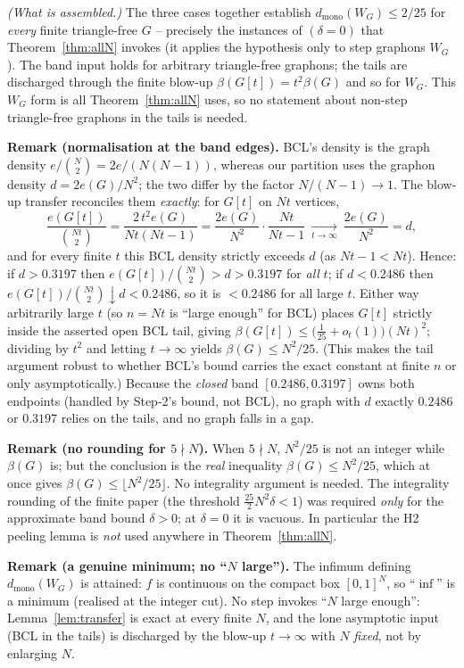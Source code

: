 \noindent\emph{(What is assembled.)} The three cases together establish
$d_{\mathrm{mono}}(W_G)\le 2/25$ for \emph{every} finite triangle-free $G$ -- precisely
the instances of $(\delta{=}0)$ that Theorem~\ref{thm:allN} invokes (it applies the
hypothesis only to step graphons $W_G$). The band input holds for arbitrary triangle-free
graphons; the tails are discharged through the finite blow-up $\beta(G[t])=t^2\beta(G)$ and
so for $W_G$. This $W_G$ form is all Theorem~\ref{thm:allN} uses, so no statement about
non-step triangle-free graphons in the tails is needed.

\noindent\textbf{Remark (normalisation at the band edges).} BCL's density is the
graph density $e/\binom{N}{2}=2e/(N(N-1))$, whereas our partition uses the graphon
density $d=2e(G)/N^2$; the two differ by the factor $N/(N-1)\to1$. The blow-up transfer
reconciles them \emph{exactly}: for $G[t]$ on $Nt$ vertices,
\[
  \frac{e(G[t])}{\binom{Nt}{2}}
  =\frac{2\,t^2 e(G)}{Nt(Nt-1)}
  =\frac{2e(G)}{N^2}\cdot\frac{Nt}{Nt-1}
  \ \xrightarrow[t\to\infty]{}\ \frac{2e(G)}{N^2}=d,
\]
and for every finite $t$ this BCL density strictly exceeds $d$ (as $Nt-1<Nt$). Hence:
if $d>0.3197$ then $e(G[t])/\binom{Nt}{2}>d>0.3197$ for \emph{all} $t$; if $d<0.2486$
then $e(G[t])/\binom{Nt}{2}\downarrow d<0.2486$, so it is $<0.2486$ for all large $t$.
Either way arbitrarily large $t$ (so $n=Nt$ is ``large enough'' for BCL) places $G[t]$
strictly inside the asserted open BCL tail, giving
$\beta(G[t])\le\bigl(\tfrac1{25}+o_t(1)\bigr)(Nt)^2$; dividing by $t^2$ and letting
$t\to\infty$ yields $\beta(G)\le N^2/25$. (This makes the tail argument robust to whether
BCL's bound carries the exact constant at finite $n$ or only asymptotically.) Because the \emph{closed} band $[0.2486,0.3197]$ owns both
endpoints (handled by Step-2's bound, not BCL), no graph with $d$ exactly $0.2486$ or
$0.3197$ relies on the tails, and no graph falls in a gap.

\noindent\textbf{Remark (no rounding for $5\nmid N$).} When $5\nmid N$, $N^2/25$ is not
an integer while $\beta(G)$ is; but the conclusion is the \emph{real} inequality
$\beta(G)\le N^2/25$, which at once gives $\beta(G)\le\lfloor N^2/25\rfloor$. No
integrality argument is needed. The integrality rounding of the finite paper (the
threshold $\tfrac{25}{2}N^2\delta<1$) was required \emph{only} for the approximate band
bound $\delta>0$; at $\delta=0$ it is vacuous. In particular the H2 peeling lemma is
\emph{not} used anywhere in Theorem~\ref{thm:allN}.

\noindent\textbf{Remark (a genuine minimum; no ``$N$ large'').} The infimum defining
$d_{\mathrm{mono}}(W_G)$ is attained: $f$ is continuous on the compact box $[0,1]^N$, so
``$\inf$'' is a minimum (realised at the integer cut). No step invokes ``$N$ large
enough'': Lemma~\ref{lem:transfer} is exact at every finite $N$, and the lone asymptotic
input (BCL in the tails) is discharged by the blow-up $t\to\infty$ with $N$ \emph{fixed},
not by enlarging $N$.


